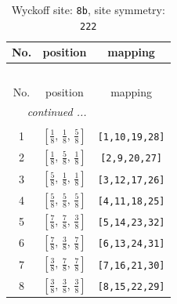 \documentclass[fleqn,8pt]{jsarticle}
\begin{document}
\begin{longtable}{ccc}
\caption{Wyckoff site: {\tt 8b}, site symmetry: {\tt 222}}
 \\
 \hline \hline
No. & position & mapping \\ \hline \endfirsthead

\multicolumn{2}{l}{\tablename\ \thetable{}} \\
 \hline \hline
No. & position & mapping \\ \hline \endhead

 \hline \hline
\multicolumn{2}{r}{\footnotesize\it continued ...} \\ \endfoot

 \hline \hline
\multicolumn{2}{r}{} \\ \endlastfoot

1 & $\left[ \frac{1}{8},\, \frac{1}{8},\, \frac{5}{8} \right]$ & {\tt [1,10,19,28]} \\ \hline
2 & $\left[ \frac{1}{8},\, \frac{5}{8},\, \frac{1}{8} \right]$ & {\tt [2,9,20,27]} \\ \hline
3 & $\left[ \frac{5}{8},\, \frac{1}{8},\, \frac{1}{8} \right]$ & {\tt [3,12,17,26]} \\ \hline
4 & $\left[ \frac{5}{8},\, \frac{5}{8},\, \frac{5}{8} \right]$ & {\tt [4,11,18,25]} \\ \hline
5 & $\left[ \frac{7}{8},\, \frac{7}{8},\, \frac{3}{8} \right]$ & {\tt [5,14,23,32]} \\ \hline
6 & $\left[ \frac{7}{8},\, \frac{3}{8},\, \frac{7}{8} \right]$ & {\tt [6,13,24,31]} \\ \hline
7 & $\left[ \frac{3}{8},\, \frac{7}{8},\, \frac{7}{8} \right]$ & {\tt [7,16,21,30]} \\ \hline
8 & $\left[ \frac{3}{8},\, \frac{3}{8},\, \frac{3}{8} \right]$ & {\tt [8,15,22,29]} \\
\end{longtable}
\renewcommand{\arraystretch}{1.2}
\end{document}
